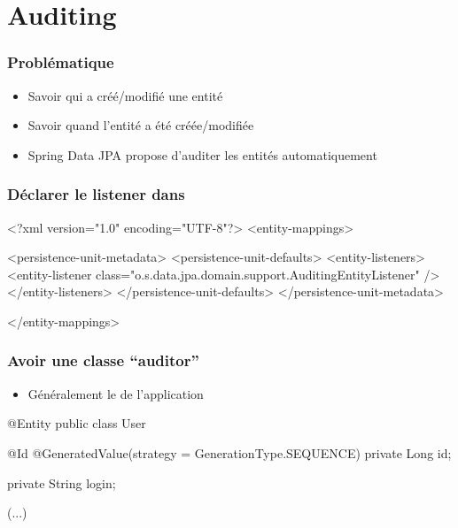 \section{Auditing}



\begin{frame}
 \frametitle{Problématique}
 \begin{itemize}
  \item Savoir qui a créé/modifié une entité
  \item Savoir quand l'entité a été créée/modifiée
  \item Spring Data JPA propose d'auditer les entités automatiquement
 \end{itemize}
\end{frame}

\begin{frame}[fragile]
 \frametitle{Déclarer le listener dans }

 \begin{xmlcode}
<?xml version="1.0" encoding="UTF-8"?>
<entity-mappings>

  <persistence-unit-metadata>
    <persistence-unit-defaults>
      <entity-listeners>
        <entity-listener 
          class="o.s.data.jpa.domain.support.AuditingEntityListener" />
      </entity-listeners>
    </persistence-unit-defaults>
  </persistence-unit-metadata>

</entity-mappings>
 \end{xmlcode}
\end{frame}

\begin{frame}[fragile]
 \frametitle{Avoir une classe ``auditor''}

 \begin{itemize}
  \item Généralement le  de l'application
 \end{itemize}

 \begin{javacode}
@Entity
public class User {

  @Id
  @GeneratedValue(strategy = GenerationType.SEQUENCE)
  private Long id;

  private String login;
  
  (...)
}
 \end{javacode}
\end{frame}

